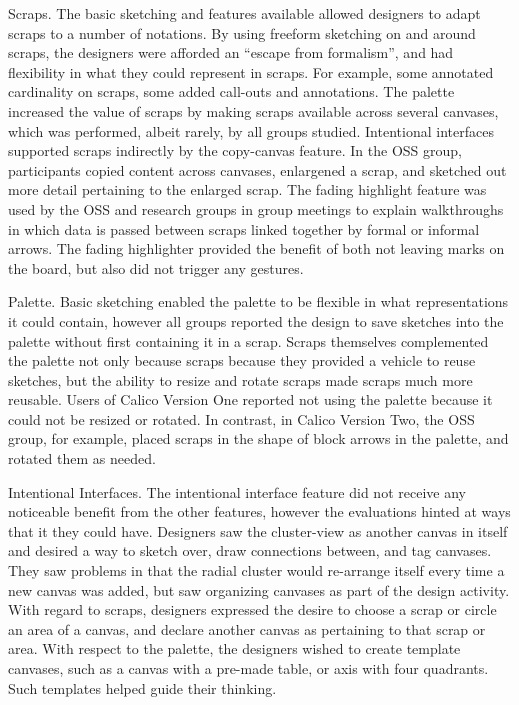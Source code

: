 Scraps. The basic sketching and features available allowed designers to adapt scraps to a number of notations. By using freeform sketching on and around scraps, the designers were afforded an ``escape from formalism'', and had flexibility in what they could represent in scraps. For example, some annotated cardinality on scraps, some added call-outs and annotations. The palette increased the value of scraps by making scraps available across several canvases, which was performed, albeit rarely, by all groups studied. Intentional interfaces supported scraps indirectly by the copy-canvas feature. In the OSS group, participants copied content across canvases, enlargened a scrap, and sketched out more detail pertaining to the enlarged scrap. The fading highlight feature was used by the OSS and research groups in group meetings to explain walkthroughs in which data is passed between scraps linked together by formal or informal arrows. The fading highlighter provided the benefit of both not leaving marks on the board, but also did not trigger any gestures.

Palette. Basic sketching enabled the palette to be flexible in what representations it could contain, however all groups reported the design to save sketches into the palette without first containing it in a scrap. Scraps themselves complemented the palette not only because scraps because they provided a vehicle to reuse sketches, but the ability to resize and rotate scraps made scraps much more reusable. Users of Calico Version One reported not using the palette because it could not be resized or rotated. In contrast, in Calico Version Two, the OSS group, for example, placed scraps in the shape of block arrows in the palette, and rotated them as needed. 

Intentional Interfaces. The intentional interface feature did not receive any noticeable benefit from the other features, however the evaluations hinted at ways that it they could have. Designers saw the cluster-view as another canvas in itself and desired a way to sketch over, draw connections between, and tag canvases. They saw problems in that the radial cluster would re-arrange itself every time a new canvas was added, but saw organizing canvases as part of the design activity. With regard to scraps, designers expressed the desire to choose a scrap or circle an area of a canvas, and declare another canvas as pertaining to that scrap or area. With respect to the palette, the designers wished to create template canvases, such as a canvas with a pre-made table, or axis with four quadrants. Such templates helped guide their thinking. 

